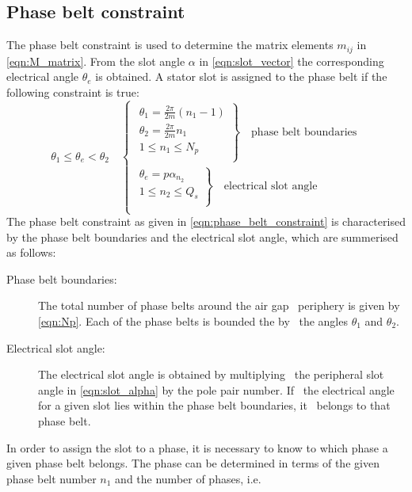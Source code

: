 \subsection{Phase belt constraint}
The phase belt constraint is used to determine the matrix elements $m_{ij}$ in \eqref{eqn:M_matrix}. From the slot angle $\alpha$ in \eqref{eqn:slot_vector} the corresponding electrical angle $\theta_e$ is obtained. A stator slot is assigned to the phase belt if the following constraint is true:
\begin{equation}  
 \label{eqn:phase_belt_constraint}
  \theta_1 \leq \theta_e  < \theta_2
  \quad
  \begin{cases}
    \left.
      \begin{array}{l}
        \theta_1 = \frac{2\pi}{2m}\left(n_1-1\right) \\
        \theta_2 = \frac{2\pi}{2m}n_1 \\
        1 \leq n_1 \leq N_p \\      
      \end{array}
    \right\} 
    \quad \mbox{phase belt boundaries} \\
    \left.
      \begin{array}{l}
        \theta_e = p\alpha_{n_2} \\
        1 \leq n_2 \leq Q_s \\      
      \end{array}    \right\} 
    \quad \mbox{electrical slot angle} \\
  \end{cases}
\end{equation} 
The phase belt constraint as given in \eqref{eqn:phase_belt_constraint} is characterised by the phase belt boundaries and the electrical slot angle, which are summerised as follows:
\begin{description}
  \item[Phase belt boundaries:] The total number of phase belts around the air gap~%
  periphery is given by \eqref{eqn:Np}. Each of the phase belts is bounded the by~%
  the angles $\theta_1$ and $\theta_2$.
  \item[Electrical slot angle:] The electrical slot angle is obtained by multiplying~%
  the peripheral slot angle in \eqref{eqn:slot_alpha} by the pole pair number. If~%
  the electrical angle for a given slot lies within the phase belt boundaries, it~%
  belongs to that phase belt.   
\end{description}
In order to assign the slot to a phase, it is necessary to know to which phase a given phase belt belongs. The phase can be determined in terms of the given phase belt number $n_1$ and the number of phases, i.e.
